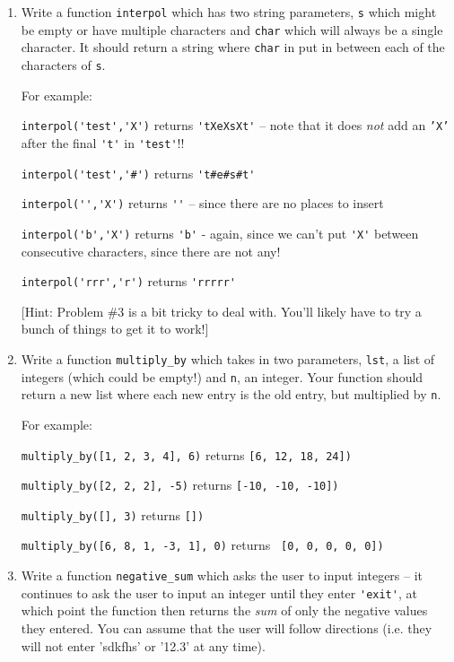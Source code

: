 \documentclass{article}
\begin{document}
\begin{enumerate}
\item Write a function \verb|interpol| which has two string parameters, \verb|s| which might be empty or have multiple characters and \verb|char| which will always be a single character. It should return a string where \verb|char| in put in between each of the characters of \verb|s|.

    For example:

\verb|interpol('test','X')| returns \verb|'tXeXsXt'| -- note that it does \emph{not} add an \texttt{'X'} after the final \verb|'t'| in \verb|'test'|!!

\verb|interpol('test','#')| returns \verb|'t#e#s#t'|

\verb|interpol('','X')| returns \verb|''| -- since there are no places to insert

\verb|interpol('b','X')| returns \verb|'b'| - again, since we can't put \verb|'X'| between consecutive characters, since there are not any!

\verb|interpol('rrr','r')| returns \verb|'rrrrr'|

[Hint: Problem \#3 is a bit tricky to deal with. You'll likely have to try a bunch of things to get it to work!]
\vfill

\item Write a function \verb|multiply_by| which takes in two parameters, \verb|lst|, a list of integers (which could be empty!) and \verb|n|, an integer. Your function should return a new list where each new entry is the old entry, but multiplied by \verb|n|.

    For example:

\verb|multiply_by([1, 2, 3, 4], 6)| returns \verb|[6, 12, 18, 24])|

\verb|multiply_by([2, 2, 2], -5)| returns \verb|[-10, -10, -10])|

\verb|multiply_by([], 3)| returns \verb|[])|

\verb|multiply_by([6, 8, 1, -3, 1], 0)| returns \verb| [0, 0, 0, 0, 0])|

\vfill
\eject

\item Write a function \verb|negative_sum| which asks the user to
  input integers -- it continues to ask the user to input an integer
  until they enter \verb|'exit'|, at which point the function then returns
  the \emph{sum} of only the negative values they entered. You can assume that the
  user will follow directions (i.e. they will not enter 'sdkfhs' or
  '12.3' at any time).



\end{enumerate}
\end{document}
